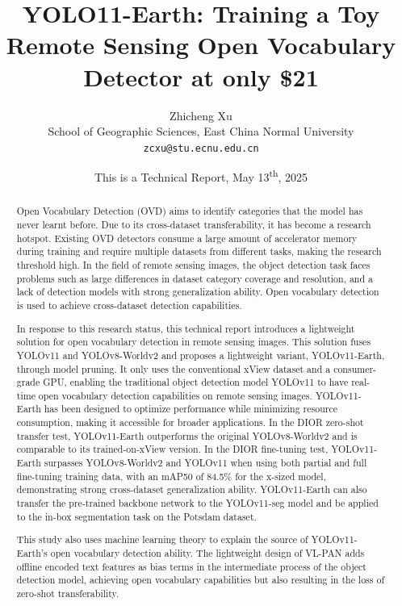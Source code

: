 \documentclass{article}
\date{This is a Technical Report, May 13\textsuperscript{th}, 2025}
\title{YOLO11-Earth: Training a Toy Remote Sensing Open Vocabulary Detector at only \$21}
\author{
    Zhicheng Xu \\
    School of Geographic Sciences, East China Normal University \\
    \texttt{zcxu@stu.ecnu.edu.cn}\\
}
\begin{document}
\maketitle

\begin{abstract}
Open Vocabulary Detection (OVD) aims to identify categories that the model has
never learnt before. Due to its cross-dataset transferability, it has become a
research hotspot. Existing OVD detectors consume a large amount of accelerator
memory during training and require multiple datasets from different tasks,
making the research threshold high. In the field of remote sensing images, the
object detection task faces problems such as large differences in dataset
category coverage and resolution, and a lack of detection models with strong
generalization ability. Open vocabulary detection is used to achieve
cross-dataset detection capabilities.

In response to this research status, this technical report introduces a lightweight
solution for open vocabulary detection in remote sensing images. This solution
fuses YOLOv11 and YOLOv8-Worldv2 and proposes a lightweight variant,
YOLOv11-Earth, through model pruning. It only uses the conventional xView
dataset and a consumer-grade GPU, enabling the traditional object detection
model YOLOv11 to have real-time open vocabulary detection capabilities on
remote sensing images. YOLOv11-Earth has been designed to optimize performance
while minimizing resource consumption, making it accessible for broader applications. 
In the DIOR zero-shot transfer test, YOLOv11-Earth outperforms the original
YOLOv8-Worldv2 and is comparable to its trained-on-xView version. In the DIOR
fine-tuning test, YOLOv11-Earth surpasses YOLOv8-Worldv2 and YOLOv11 when
using both partial and full fine-tuning training data, with an mAP50 of 84.5\%
for the x-sized model, demonstrating strong cross-dataset generalization
ability. YOLOv11-Earth can also transfer the pre-trained backbone network to
the YOLOv11-seg model and be applied to the in-box segmentation task on the
Potsdam dataset.

This study also uses machine learning theory to explain the source of
YOLOv11-Earth's open vocabulary detection ability. The lightweight design of
VL-PAN adds offline encoded text features as bias terms in the intermediate
process of the object detection model, achieving open vocabulary capabilities
but also resulting in the loss of zero-shot transferability.
\end{abstract}
\end{document}
